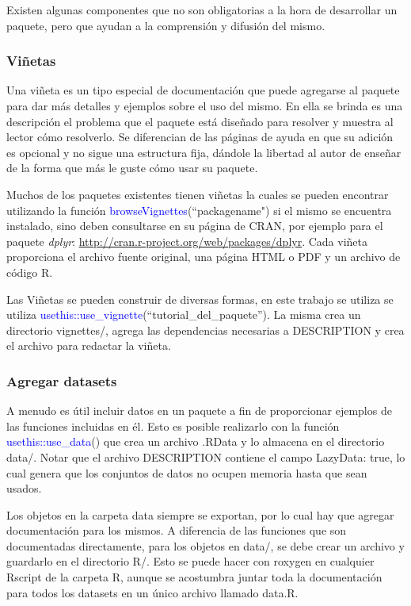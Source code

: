 Existen algunas componentes que no son obligatorias a la hora de desarrollar un paquete, pero que ayudan a la comprensión y difusión del mismo.

\subsubsection{Viñetas}

Una viñeta es un tipo especial de documentación que puede agregarse al paquete para dar más detalles y ejemplos sobre el uso del mismo. En ella se brinda es una descripción el problema que el paquete está diseñado para resolver y muestra al lector cómo resolverlo. Se diferencian de las páginas de ayuda en que su adición es opcional y no sigue una estructura fija, dándole la libertad al autor de enseñar de la forma que más le guste cómo usar su paquete.

Muchos de los paquetes existentes tienen viñetas la cuales se pueden encontrar utilizando la función \textcolor{blue}{browseVignettes}(``packagename") si el mismo se encuentra instalado, sino deben consultarse en su página de CRAN, por ejemplo para el paquete \emph{dplyr}: \url{http://cran.r-project.org/web/packages/dplyr}. Cada viñeta proporciona el archivo fuente original, una página HTML o PDF y un archivo de código R. 

Las Viñetas se pueden construir de diversas formas, en este trabajo se utiliza se utiliza \textcolor{blue}{usethis::use\_vignette}(``tutorial\_del\_paquete''). La misma crea un directorio vignettes/, agrega las dependencias necesarias a DESCRIPTION y crea el archivo para redactar la viñeta. 


\subsubsection{Agregar datasets}

A menudo es útil incluir datos en un paquete a fin de proporcionar ejemplos de las funciones incluidas en él. Esto es posible realizarlo con la función \textcolor{blue}{usethis::use\_data}() que crea un archivo .RData y lo almacena en el directorio data/.  Notar que el archivo DESCRIPTION contiene el campo LazyData: true, lo cual genera que los conjuntos de datos no ocupen memoria hasta que sean usados.

Los objetos en la carpeta data siempre se exportan, por lo cual hay que agregar documentación para los mismos. A diferencia de las funciones que son documentadas directamente, para los objetos en data/, se debe crear un archivo y guardarlo en el directorio R/. Esto se puede hacer con roxygen en cualquier Rscript de la carpeta R, aunque se acostumbra juntar toda la documentación para todos los datasets en un único archivo llamado data.R.\\

